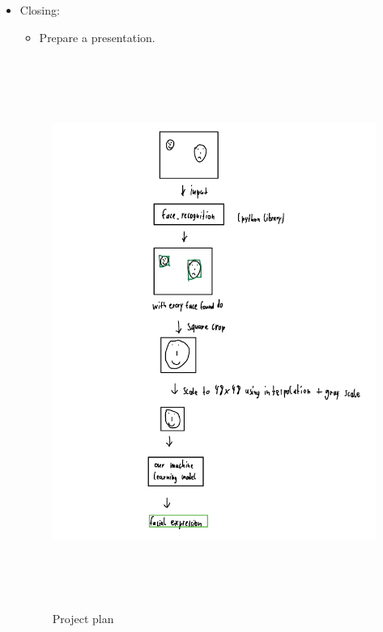 \documentclass[]{article}
\begin{document}
\begin{itemize}
\item Closing:
	\begin{itemize}
	\item Prepare a presentation.
	\end{itemize}

\begin{figure}
	\centering
    \includegraphics[height=18cm]{flow}
    \caption{Project plan}
\end{figure}

\end{itemize}
\end{document}
